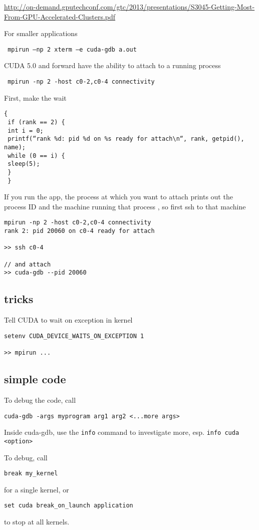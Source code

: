 \url{http://on-demand.gputechconf.com/gtc/2013/presentations/S3045-Getting-Most-From-GPU-Accelerated-Clusters.pdf}

For smaller applications
\begin{verbatim}
 mpirun –np 2 xterm –e cuda-gdb a.out
\end{verbatim}

CUDA 5.0 and forward have the ability to attach to a running process
\begin{verbatim}
 mpirun -np 2 -host c0-2,c0-4 connectivity
\end{verbatim}
First, make the wait
\begin{verbatim}
{
 if (rank == 2) {
 int i = 0;
 printf(“rank %d: pid %d on %s ready for attach\n“, rank, getpid(), name);
 while (0 == i) {
 sleep(5);
 }
 }
\end{verbatim}

If you run the app, the process at which you want to attach prints out the
process ID and the machine running that process , so first ssh to that machine
\begin{verbatim}
mpirun -np 2 -host c0-2,c0-4 connectivity
rank 2: pid 20060 on c0-4 ready for attach

>> ssh c0-4

// and attach
>> cuda-gdb --pid 20060
\end{verbatim}

\subsection{tricks}

Tell CUDA to wait on exception in kernel
\begin{verbatim}
setenv CUDA_DEVICE_WAITS_ON_EXCEPTION 1

>> mpirun ...
\end{verbatim}

\subsection{simple code}

To debug the code, call
\begin{verbatim}
cuda-gdb -args myprogram arg1 arg2 <...more args>
\end{verbatim}

Inside cuda-gdb, use the \verb!info! command to investigate more, esp.
\verb!info cuda <option>!

To debug, call 
\begin{verbatim}
break my_kernel
\end{verbatim}
for a single kernel, or
\begin{verbatim}
set cuda break_on_launch application
\end{verbatim}
to stop at all kernels.

